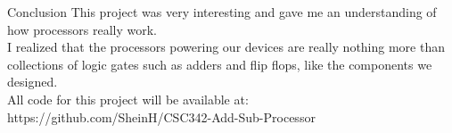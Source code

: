 \documentclass{beamer}
\begin{document}
\begin{frame}{Conclusion}
    This project was very interesting and gave me an understanding of how processors really work. \\
    I realized that the processors powering our devices are really nothing more than collections of logic gates such as adders and flip flops, like the components we designed.\\

    All code for this project will be available at: https://github.com/SheinH/CSC342-Add-Sub-Processor
\end{frame}
\end{document}

